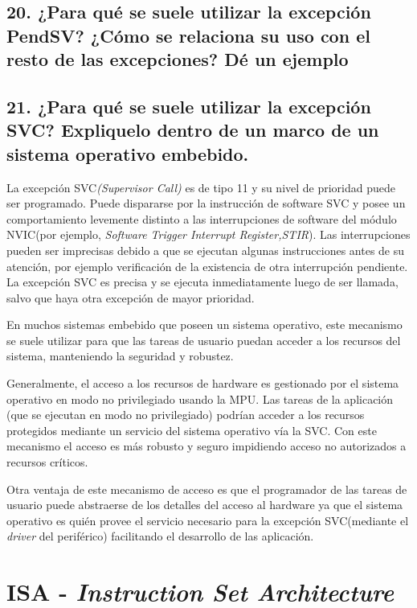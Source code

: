 \documentclass[10pt,a4paper,twoside,spanish]{article}	%
\begin{document}
\subsection*{20. ¿Para qué se suele utilizar la excepción PendSV? ¿Cómo se relaciona su uso con el resto de las excepciones? Dé un ejemplo}

\subsection*{21. ¿Para qué se suele utilizar la excepción SVC? Expliquelo dentro de un marco de un sistema operativo embebido.}

La excepción SVC\textit{(Supervisor Call)} es de tipo 11 y su nivel de prioridad puede ser programado. Puede dispararse por la instrucción de software SVC y posee un comportamiento levemente distinto a las interrupciones de software del módulo NVIC(por ejemplo, \textit{Software Trigger Interrupt Register,STIR}). Las interrupciones pueden ser imprecisas debido a que se ejecutan algunas instrucciones antes de su atención, por ejemplo verificación de la existencia de otra interrupción pendiente. La excepción SVC es precisa y se ejecuta inmediatamente luego de ser llamada, salvo que haya otra excepción de mayor prioridad.

En muchos sistemas embebido que poseen un sistema operativo, este mecanismo se suele utilizar para que las tareas de usuario puedan acceder a los recursos del sistema, manteniendo la seguridad y robustez.

Generalmente, el acceso a los recursos de hardware es gestionado por el sistema operativo en modo no privilegiado usando la MPU. Las tareas de la aplicación (que se ejecutan en modo no privilegiado) podrían acceder a los recursos protegidos mediante un servicio del sistema operativo vía la SVC. Con este mecanismo el acceso es más robusto y seguro impidiendo acceso no autorizados a recursos críticos.  


Otra ventaja de este mecanismo de acceso es que el programador de las tareas de usuario puede abstraerse de los detalles del acceso al hardware ya que el sistema operativo es quién provee el servicio necesario para la excepción SVC(mediante el \textit{driver} del periférico) facilitando el desarrollo de las aplicación.

 
\section*{ISA - \textit{Instruction Set Architecture}}
\end{document}
